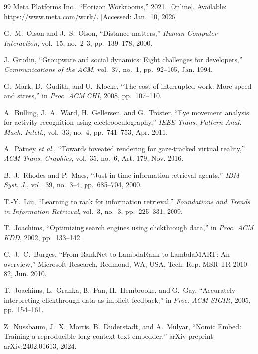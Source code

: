 \documentclass[journal]{IEEEtran}
\begin{document}
\begin{thebibliography}{99}
Meta Platforms Inc., ``Horizon Workrooms,'' 2021. [Online]. Available: \url{https://www.meta.com/work/}. [Accessed: Jan.~10, 2026]

G.~M.~Olson and J.~S.~Olson, ``Distance matters,'' \emph{Human-Computer Interaction}, vol.~15, no.~2--3, pp.~139--178, 2000.

J.~Grudin, ``Groupware and social dynamics: Eight challenges for developers,'' \emph{Communications of the ACM}, vol.~37, no.~1, pp.~92--105, Jan. 1994.

G.~Mark, D.~Gudith, and U.~Klocke, ``The cost of interrupted work: More speed and stress,'' in \emph{Proc. ACM CHI}, 2008, pp.~107--110.

A.~Bulling, J.~A.~Ward, H.~Gellersen, and G.~Tr\"{o}ster, ``Eye movement analysis for activity recognition using electrooculography,'' \emph{IEEE Trans. Pattern Anal. Mach. Intell.}, vol.~33, no.~4, pp.~741--753, Apr. 2011.

A.~Patney \emph{et al.}, ``Towards foveated rendering for gaze-tracked virtual reality,'' \emph{ACM Trans. Graphics}, vol.~35, no.~6, Art. 179, Nov. 2016.

B.~J.~Rhodes and P.~Maes, ``Just-in-time information retrieval agents,'' \emph{IBM Syst. J.}, vol.~39, no.~3--4, pp.~685--704, 2000.

T.-Y.~Liu, ``Learning to rank for information retrieval,'' \emph{Foundations and Trends in Information Retrieval}, vol.~3, no.~3, pp.~225--331, 2009.

T.~Joachims, ``Optimizing search engines using clickthrough data,'' in \emph{Proc. ACM KDD}, 2002, pp.~133--142.

C.~J.~C.~Burges, ``From RankNet to LambdaRank to LambdaMART: An overview,'' Microsoft Research, Redmond, WA, USA, Tech. Rep. MSR-TR-2010-82, Jun. 2010.

T.~Joachims, L.~Granka, B.~Pan, H.~Hembrooke, and G.~Gay, ``Accurately interpreting clickthrough data as implicit feedback,'' in \emph{Proc. ACM SIGIR}, 2005, pp.~154--161.

Z.~Nussbaum, J.~X.~Morris, B.~Duderstadt, and A.~Mulyar, ``Nomic Embed: Training a reproducible long context text embedder,'' arXiv preprint arXiv:2402.01613, 2024.


\end{thebibliography}
\end{document}

